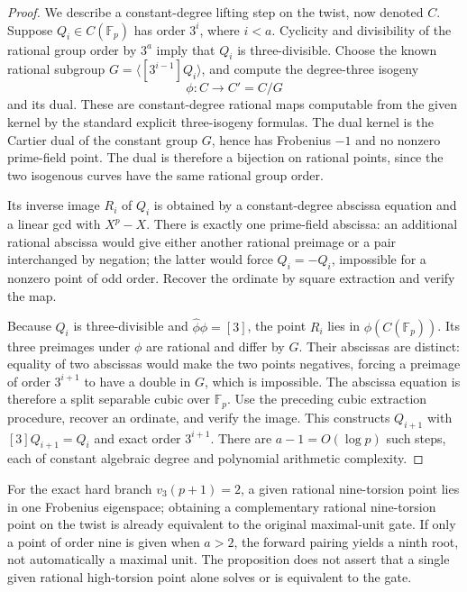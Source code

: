 \documentclass[11pt]{article}
\theoremstyle{definition}
\theoremstyle{remark}
\begin{document}
\begin{proof}
We describe a constant-degree lifting step on the twist,
now denoted $C$.  Suppose $Q_i\in C(\mathbb F_p)$ has
order $3^i$, where $i<a$.  Cyclicity and divisibility of
the rational group order by $3^a$ imply that $Q_i$ is
three-divisible.  Choose the known rational subgroup
$G=\langle[3^{i-1}]Q_i\rangle$, and compute the
degree-three isogeny
\[
 \phi:C\longrightarrow C'=C/G
\]
and its dual.  These are constant-degree rational maps
computable from the given kernel by the standard explicit
three-isogeny formulas.  The dual kernel is the Cartier
dual of the constant group $G$, hence has Frobenius $-1$
and no nonzero prime-field point.  The dual is therefore
a bijection on rational points, since the two isogenous
curves have the same rational group order.

Its inverse image $R_i$ of $Q_i$ is obtained by a
constant-degree abscissa equation and a linear gcd with
$X^p-X$.  There is exactly one prime-field abscissa:
an additional rational abscissa would give either another
rational preimage or a pair interchanged by negation;
the latter would force $Q_i=-Q_i$, impossible for a
nonzero point of odd order.  Recover the ordinate by
square extraction and verify the map.

Because $Q_i$ is three-divisible and
$\widehat\phi\phi=[3]$, the point $R_i$ lies in
$\phi(C(\mathbb F_p))$.  Its three preimages under
$\phi$ are rational and differ by $G$.  Their abscissas
are distinct: equality of two abscissas would make
the two points negatives, forcing a preimage of order
$3^{i+1}$ to have a double in $G$, which is impossible.
The abscissa equation is therefore a split separable
cubic over $\mathbb F_p$.  Use the preceding cubic
extraction procedure, recover an ordinate, and verify
the image.  This constructs $Q_{i+1}$ with
$[3]Q_{i+1}=Q_i$ and exact order $3^{i+1}$.
There are $a-1=O(\log p)$ such steps, each of constant
algebraic degree and polynomial arithmetic complexity.
\end{proof}

For the exact hard branch $v_3(p+1)=2$, a given rational
nine-torsion point lies in one Frobenius eigenspace; obtaining
a complementary rational nine-torsion point on the twist is
already equivalent to the original maximal-unit gate.  If
only a point of order nine is given when $a>2$, the forward
pairing yields a ninth root, not automatically a maximal unit.
The proposition does not assert that a single given rational
high-torsion point alone solves or is equivalent to the gate.
\end{document}
